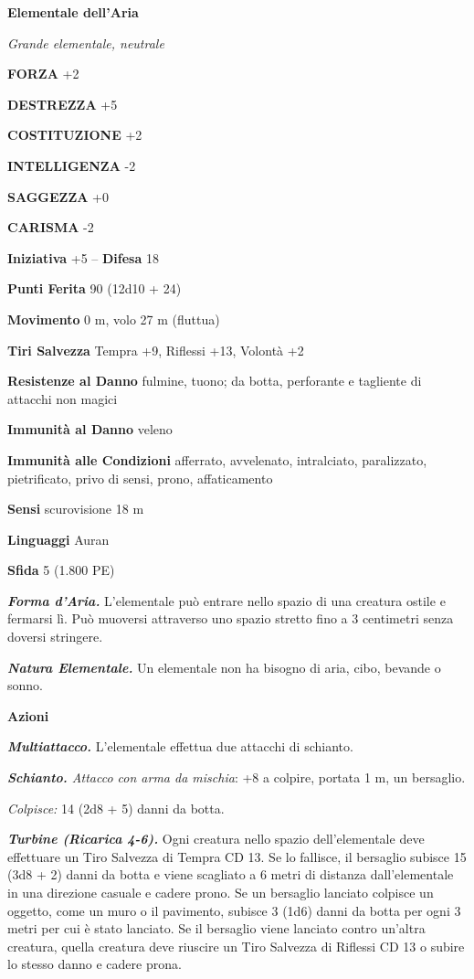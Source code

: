 \begin{multicols}{2}
\medskip{}\textbf{Elementale dell'Aria}

\emph{Grande elementale, neutrale}

\textbf{FORZA} +2

\textbf{DESTREZZA} +5

\textbf{COSTITUZIONE} +2

\textbf{INTELLIGENZA} -2

\textbf{SAGGEZZA} +0

\textbf{CARISMA} -2

\textbf{Iniziativa} +5 -- \textbf{Difesa} 18

\textbf{Punti Ferita} 90 (12d10 + 24)

\textbf{Movimento} 0 m, volo 27 m (fluttua)

\textbf{Tiri Salvezza} Tempra +9, Riflessi +13, Volontà +2

\textbf{Resistenze al Danno} fulmine, tuono; da botta, perforante e tagliente di attacchi non magici

\textbf{Immunità al Danno} veleno

\textbf{Immunità alle Condizioni} afferrato, avvelenato, intralciato, paralizzato, pietrificato, privo di sensi, prono, affaticamento

\textbf{Sensi} scurovisione 18 m

\textbf{Linguaggi} Auran

\textbf{Sfida} 5 (1.800 PE)

\emph{\textbf{Forma d'Aria.}} L'elementale può entrare nello spazio di una creatura ostile e fermarsi lì. Può muoversi attraverso uno spazio stretto fino a 3 centimetri senza doversi stringere.

\emph{\textbf{Natura Elementale.}} Un elementale non ha bisogno di aria, cibo, bevande o sonno.

\textbf{Azioni}

\emph{\textbf{Multiattacco.}} L'elementale effettua due attacchi di schianto.

\emph{\textbf{Schianto.} Attacco con arma da mischia}: +8 a colpire, portata 1 m, un bersaglio.

\emph{Colpisce:} 14 (2d8 + 5) danni da botta.

\emph{\textbf{Turbine (Ricarica 4-6).}} Ogni creatura nello spazio dell'elementale deve effettuare un Tiro Salvezza di Tempra CD 13. Se lo fallisce, il bersaglio subisce 15 (3d8 + 2) danni da botta e viene scagliato a 6 metri di distanza dall'elementale in una direzione casuale e cadere prono. Se un bersaglio lanciato colpisce un oggetto, come un muro o il pavimento, subisce 3 (1d6) danni da botta per ogni 3 metri per cui è stato lanciato. Se il bersaglio viene lanciato contro un'altra creatura, quella creatura deve riuscire un Tiro Salvezza di Riflessi CD 13 o subire lo stesso danno e cadere prona.


\end{multicols}
